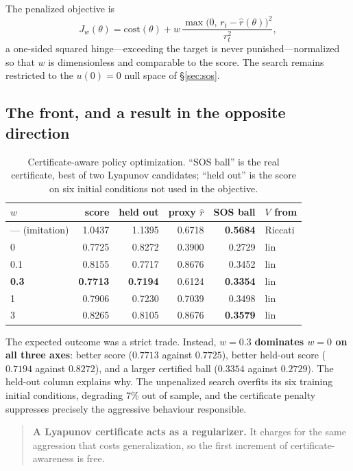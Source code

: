 \documentclass[11pt]{article}
\theoremstyle{plain}
\theoremstyle{definition}
\begin{document}
The penalized objective is
\begin{equation}
J_w(\theta)=\mathrm{cost}(\theta)
+w\,\frac{\max\!\big(0,\,r_t-\hat r(\theta)\big)^{2}}{r_t^{2}},
\label{eq:penalty}
\end{equation}
a one-sided squared hinge---exceeding the target is never punished---normalized
so that $w$ is dimensionless and comparable to the score. The search remains
restricted to the $u(0)=0$ null space of \S\ref{sec:sos}.

\subsection{The front, and a result in the opposite direction}

\begin{table}[t]
\centering
\caption{Certificate-aware policy optimization. ``SOS ball'' is the real
certificate, best of two Lyapunov candidates; ``held out'' is the score on six
initial conditions not used in the objective.}
\label{tab:front}
\begin{tabular}{lrrrrl}
\toprule
$w$ & score & held out & proxy $\hat r$ & SOS ball & $V$ from \\
\midrule
--- (imitation) & 1.0437 & 1.1395 & 0.6718 & \textbf{0.5684} & Riccati \\
0               & 0.7725 & 0.8272 & 0.3900 & 0.2729 & lin \\
0.1             & 0.8155 & 0.7717 & 0.8676 & 0.3452 & lin \\
\textbf{0.3}    & \textbf{0.7713} & \textbf{0.7194} & 0.6124 & \textbf{0.3354} & lin \\
1               & 0.7906 & 0.7230 & 0.7039 & 0.3498 & lin \\
3               & 0.8265 & 0.8105 & 0.8676 & \textbf{0.3579} & lin \\
\bottomrule
\end{tabular}
\end{table}

The expected outcome was a strict trade. Instead, $w=0.3$ \textbf{dominates
$w=0$ on all three axes}: better score ($0.7713$ against $0.7725$), better
held-out score ($0.7194$ against $0.8272$), and a larger certified ball
($0.3354$ against $0.2729$). The held-out column explains why. The unpenalized
search overfits its six training initial conditions, degrading $7\%$ out of
sample, and the certificate penalty suppresses precisely the aggressive
behaviour responsible.

\begin{quote}
\textbf{A Lyapunov certificate acts as a regularizer.} It charges for the same
aggression that costs generalization, so the first increment of
certificate-awareness is free.
\end{quote}
\end{document}

